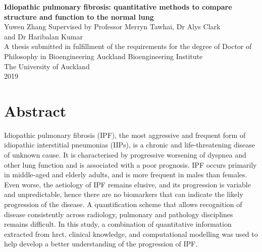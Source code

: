 \documentclass[a4paper, 12pt]{book}
\begin{document}
\frontmatter

\begin{titlepage}
  \begin{center}
    \vfill
    {\Large \textbf{Idiopathic pulmonary fibrosis: quantitative methods to compare structure and function to the normal lung}} %
    \\[6cm]
    Yuwen Zhang
    \vfill
    \normalsize Supervised by Professor Merryn Tawhai, Dr Alys Clark \\
		and Dr Haribalan Kumar \\[1cm]
    A thesis submitted in fulfillment of the requirements for the degree of Doctor of Philosophy in Bioengineering
    \vfill
    Auckland Bioengineering Institute
    \\[0.8cm] The University of Auckland
    \\[0.8cm] 2019
  \end{center}
\end{titlepage}

\cleardoublepage
\chapter*{Abstract}
Idiopathic pulmonary fibrosis (IPF), the most aggressive and frequent form of idiopathic interstitial pneumonias (IIPs), is a chronic and life-threatening disease of unknown cause. It is characterised by progressive worsening of dyspnea and other lung function and is associated with a poor prognosis. IPF occurs primarily in middle-aged and elderly adults, and is more frequent in males than females. Even worse, the aetiology of IPF remains elusive, and its progression is variable and unpredictable, hence there are no biomarkers that can indicate the likely progression of the disease. A quantification scheme that allows recognition of disease consistently across radiology, pulmonary and pathology disciplines remains difficult. In this study, a combination of quantitative information extracted from \gls{hrct}, clinical knowledge, and computational modelling was used to help develop a better understanding of the progression of IPF.
\end{document}

